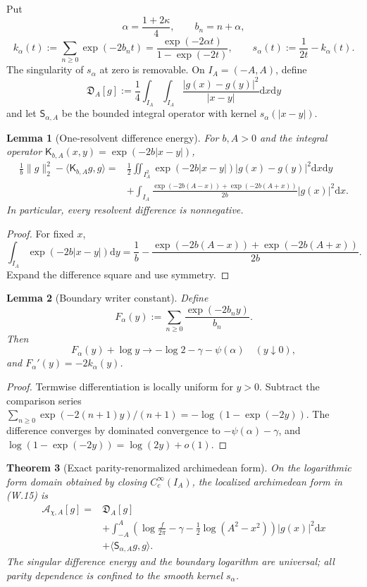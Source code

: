 \documentclass[11pt]{article}
\newtheorem{theorem}{Theorem}[section]
\newtheorem{lemma}[theorem]{Lemma}
\theoremstyle{definition}
\theoremstyle{remark}
\newcommand{\dd}{\mathrm d}
\begin{document}
Put
\[
 \alpha=\frac{1+2\kappa}{4},
 \qquad
 b_n=n+\alpha,
\]
\[
 k_\alpha(t)
 :=\sum_{n\ge0}\exp(-2b_nt)
 =\frac{\exp(-2\alpha t)}{1-\exp(-2t)},
 \qquad
 s_\alpha(t):=\frac1{2t}-k_\alpha(t).
 \tag{W.17}
\]
The singularity of $s_\alpha$ at zero is removable.  On
$I_A=(-A,A)$, define
\[
 \mathfrak D_A[g]
 :=\frac14\int_{I_A}\int_{I_A}
 \frac{|g(x)-g(y)|^2}{|x-y|}\dd x\dd y
 \tag{W.18}
\]
and let $\mathsf S_{\alpha,A}$ be the bounded integral operator with kernel
$s_\alpha(|x-y|)$.

\begin{lemma}[One-resolvent difference energy]
\label{lem:weil-one-resolvent}
For $b,A>0$ and the integral operator
$\mathsf K_{b,A}(x,y)=\exp(-2b|x-y|)$,
\[
 \boxed{
 \begin{aligned}
 \frac1b\|g\|_2^2-\langle\mathsf K_{b,A}g,g\rangle
 ={}&\frac12\iint_{I_A^2}
 \exp(-2b|x-y|)|g(x)-g(y)|^2\dd x\dd y\\
 &+\int_{I_A}
 \frac{\exp(-2b(A-x))+\exp(-2b(A+x))}{2b}
 |g(x)|^2\dd x.
 \end{aligned}}
 \tag{W.19}
\]
In particular, every resolvent difference is nonnegative.
\end{lemma}

\begin{proof}
For fixed $x$,
\[
 \int_{I_A}\exp(-2b|x-y|)\dd y
 =\frac1b-\frac{\exp(-2b(A-x))+\exp(-2b(A+x))}{2b}.
\]
Expand the difference square and use symmetry.
\end{proof}

\begin{lemma}[Boundary writer constant]
\label{lem:weil-boundary-writer}
Define
\[
 F_\alpha(y):=\sum_{n\ge0}\frac{\exp(-2b_ny)}{b_n}.
\]
Then
\[
 \boxed{
 F_\alpha(y)+\log y
 \longrightarrow-\log2-\gamma-\psi(\alpha)
 \quad(y\downarrow0),}
 \tag{W.20}
\]
and $F_\alpha'(y)=-2k_\alpha(y)$.
\end{lemma}

\begin{proof}
Termwise differentiation is locally uniform for $y>0$.  Subtract the
comparison series
$\sum_{n\ge0}\exp(-2(n+1)y)/(n+1)=-\log(1-\exp(-2y))$.
The difference converges by dominated convergence to
$-\psi(\alpha)-\gamma$, and
$\log(1-\exp(-2y))=\log(2y)+o(1)$.
\end{proof}

\begin{theorem}[Exact parity-renormalized archimedean form]
\label{thm:weil-renormalization}
On the logarithmic form domain obtained by closing $C_c^\infty(I_A)$, the
localized archimedean form in \textup{(W.15)} is
\[
 \boxed{
 \begin{aligned}
 \mathcal A_{\chi,A}[g]
 ={}&\mathfrak D_A[g]\\
 &+\int_{-A}^A
 \left(
  \log\frac f{2\pi}-\gamma
  -\frac12\log(A^2-x^2)
 \right)|g(x)|^2\dd x\\
 &+\langle\mathsf S_{\alpha,A}g,g\rangle.
 \end{aligned}}
 \tag{W.21}
\]
The singular difference energy and the boundary logarithm are universal;
all parity dependence is confined to the smooth kernel $s_\alpha$.
\end{theorem}
\end{document}
